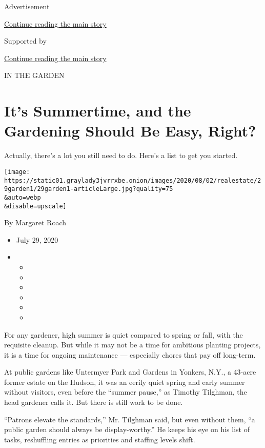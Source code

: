 Advertisement

\protect\hyperlink{after-top}{Continue reading the main story}

Supported by

\protect\hyperlink{after-sponsor}{Continue reading the main story}

IN THE GARDEN

\hypertarget{its-summertime-and-the-gardening-should-be-easy-right}{%
\section{It's Summertime, and the Gardening Should Be Easy,
Right?}\label{its-summertime-and-the-gardening-should-be-easy-right}}

Actually, there's a lot you still need to do. Here's a list to get you
started.

\texttt{[image: https://static01.graylady3jvrrxbe.onion/images/2020/08/02/realestate/29garden1/29garden1-articleLarge.jpg?quality=75\\\&auto=webp\\\&disable=upscale]}

By Margaret Roach

\begin{itemize}
\item
  July 29, 2020
\item
  \begin{itemize}
  \item
  \item
  \item
  \item
  \item
  \item
  \end{itemize}
\end{itemize}

For any gardener, high summer is quiet compared to spring or fall, with
the requisite cleanup. But while it may not be a time for ambitious
planting projects, it is a time for ongoing maintenance --- especially
chores that pay off long-term.

At public gardens like Untermyer Park and Gardens in Yonkers, N.Y., a
43-acre former estate on the Hudson, it was an eerily quiet spring and
early summer without visitors, even before the ``summer pause,'' as
Timothy Tilghman, the head gardener calls it. But there is still work to
be done.

``Patrons elevate the standards,'' Mr. Tilghman said, but even without
them, ``a public garden should always be display-worthy.'' He keeps his
eye on his list of tasks, reshuffling entries as priorities and staffing
levels shift.

